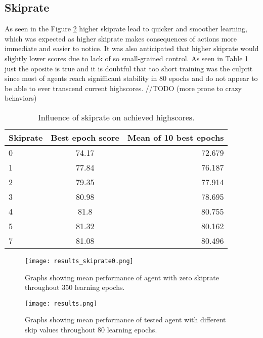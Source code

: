 	\subsection{Skiprate} 
		As seen in the Figure \ref{fig:results} higher skiprate lead to quicker and smoother learning, which was expected as higher skiprate makes consequences of actions more immediate and easier to notice. It was also anticipated that higher skiprate would slightly lower scores due to lack of so small-grained control. As seen in Table \ref{tab:results} just the oposite is true and it is doubtful that too short training was the culprit since most of agents reach signifficant stability in 80 epochs and do not appear to be able to ever transcend current highscores.  //TODO (more prone to crazy behaviors)
	\begin{table}
		\begin{center}
			\begin{tabular}{ |l || c | r |}
				\hline
				Skiprate & Best epoch score & Mean of 10 best epochs \\ \hline
				0 & 74.17 & 72.679 \\ \hline
				1 & 77.84 & 76.187 \\ \hline
				2 & 79.35 & 77.914 \\ \hline
				3 & 80.98 & 78.695 \\ \hline
				4 & 81.8 & 80.755 \\ \hline
				5 & 81.32 & 80.162 \\ \hline
				7 & 81.08 & 80.496 \\ \hline
			\end{tabular}
		\end{center}
		\caption{Influence of skiprate on achieved highscores.}\label{tab:results}
	\end{table}

	\begin{figure}
		\centering
		\texttt{[image: results\_skiprate0.png]}
		\caption{Graphs showing mean performance of agent with zero skiprate throughout 350 learning epochs.}\label{fig:results_skiprate0}
	\end{figure}

	\begin{figure}
		\centering
		\texttt{[image: results.png]}
		\caption{Graphs showing mean performance of tested agent with different skip values throughout 80 learning epochs.}\label{fig:results}
	\end{figure}